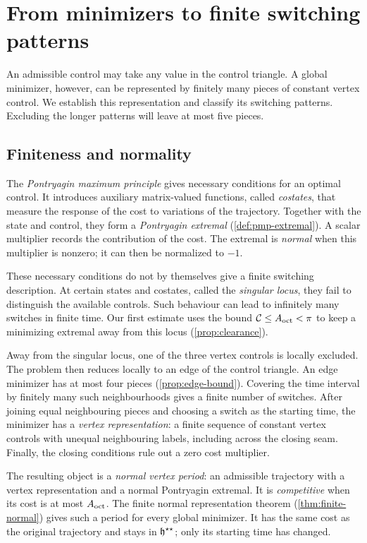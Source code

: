 \section{From minimizers to finite switching patterns}\label{sec:outline-periods}

An admissible control may take any value in the control triangle. A global minimizer, however, can
be represented by finitely many pieces of constant vertex control. We establish this
representation and classify its switching patterns. Excluding the longer patterns will leave at
most five pieces.

\subsection{Finiteness and normality}\label{sec:outline-reduction}

The \emph{Pontryagin maximum principle} gives necessary conditions for an optimal control. It
introduces auxiliary matrix-valued functions, called \emph{costates}, that measure the response of
the cost to variations of the trajectory. Together with the state and control, they form a
\emph{Pontryagin extremal} (\cref{def:pmp-extremal}). A scalar multiplier records the contribution
of the cost. The extremal is \emph{normal} when this multiplier is nonzero; it can then be
normalized to $-1$.

These necessary conditions do not by themselves give a finite switching description. At certain
states and costates, called the \emph{singular locus}, they fail to distinguish the available
controls. Such behaviour can lead to infinitely many switches in finite time. Our first estimate
uses the bound $\mathcal{C}\le A_{\mathrm{oct}}<\pi$ to keep a minimizing extremal away from this locus
(\cref{prop:clearance}).

Away from the singular locus, one of the three vertex controls is locally excluded. The problem
then reduces locally to an edge of the control triangle. An edge minimizer has at most four
pieces (\cref{prop:edge-bound}). Covering the time interval by finitely many such neighbourhoods
gives a finite number of switches. After joining equal neighbouring pieces and choosing a switch
as the starting time, the minimizer has a \emph{vertex representation}: a finite sequence of
constant vertex controls with unequal neighbouring labels, including across the closing seam.
Finally, the closing conditions rule out a zero cost multiplier.

The resulting object is a \emph{normal vertex period}: an admissible trajectory with a vertex
representation and a normal Pontryagin extremal. It is \emph{competitive} when its cost is at
most $A_{\mathrm{oct}}$. The finite normal representation theorem (\cref{thm:finite-normal}) gives such a
period for every global minimizer. It has the same cost as the original trajectory and stays in
$\mathfrak{h}^{\star\star}$; only its starting time has changed.

